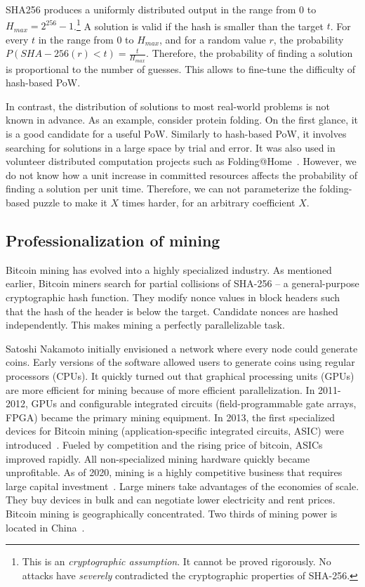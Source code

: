 SHA256 produces a uniformly distributed output in the range from $0$ to $H_{max} = 2^{256}-1$.\footnote{This is an \textit{cryptographic assumption}. It cannot be proved rigorously. No attacks have \textit{severely} contradicted the cryptographic properties of SHA-256.}
A solution is valid if the hash is smaller than the target $t$.
For every $t$ in the range from $0$ to $H_{max}$, and for a random value $r$, the probability $P(SHA-256(r) < t) = \frac{t}{H_{max}}$.
Therefore, the probability of finding a solution is proportional to the number of guesses.
This allows to fine-tune the difficulty of hash-based PoW.

In contrast, the distribution of solutions to most real-world problems is not known in advance.
As an example, consider protein folding.
On the first glance, it is a good candidate for a useful PoW.
Similarly to hash-based PoW, it involves searching for solutions in a large space by trial and error.
It was also used in volunteer distributed computation projects such as Folding@Home~\cite{Beberg2009}.
However, we do not know how a unit increase in committed resources affects the probability of finding a solution per unit time.
Therefore, we can not parameterize the folding-based puzzle to make it $X$ times harder, for an arbitrary coefficient $X$.


\subsection{Professionalization of mining}

Bitcoin mining has evolved into a highly specialized industry.
As mentioned earlier, Bitcoin miners search for partial collisions of SHA-256 -- a general-purpose cryptographic hash function.
They modify nonce values in block headers such that the hash of the header is below the target.
Candidate nonces are hashed independently.
This makes mining a perfectly parallelizable task.

Satoshi Nakamoto initially envisioned a network where every node could generate coins.
Early versions of the software allowed users to generate coins using regular processors (CPUs).
It quickly turned out that graphical processing units (GPUs) are more efficient for mining because of more efficient parallelization.
In 2011-2012, GPUs and configurable integrated circuits (field-programmable gate arrays, FPGA) became the primary mining equipment.
In 2013, the first specialized devices for Bitcoin mining (application-specific integrated circuits, ASIC) were introduced~\cite{Kim2020}.
Fueled by competition and the rising price of bitcoin, ASICs improved rapidly.
All non-specialized mining hardware quickly became unprofitable.
As of 2020, mining is a highly competitive business that requires large capital investment~\cite{Kroll2013}.
Large miners take advantages of the economies of scale.
They buy devices in bulk and can negotiate lower electricity and rent prices.
Bitcoin mining is geographically concentrated.
Two thirds of mining power is located in China~\cite{Rauchs2020}.

